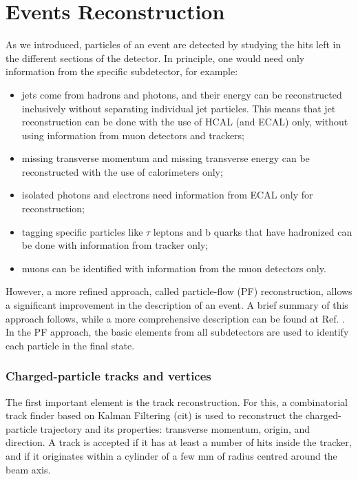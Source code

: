 \section{Events Reconstruction}
As we introduced, particles of an event are detected by studying the hits left in the different sections of the detector. In principle, one would need only information from the specific subdetector, for example:
\begin{itemize}
    \item jets come from hadrons and photons, and their energy can be reconstructed inclusively without separating individual jet particles. This means that jet reconstruction can be done with the use of HCAL (and ECAL) only, without using information from muon detectors and trackers;
    \item missing transverse momentum and missing transverse energy can be reconstructed with the use of calorimeters only;
    \item isolated photons and electrons need information from ECAL only for reconstruction;
    \item tagging specific particles like $\tau$ leptons and b quarks that have hadronized can be done with information from tracker only;
    \item muons can be identified with information from the muon detectors only.
\end{itemize}
However, a more refined approach, called particle-flow (PF) reconstruction, allows a significant improvement in the description of an event. A brief summary of this approach follows, while a more comprehensive description can be found at Ref. \cite{particle_flow}.\\
In the PF approach, the basic elements from all subdetectors are used to identify each particle in the final state.
\subsubsection{Charged-particle tracks and vertices}
The first important element is the track reconstruction. For this, a combinatorial track finder based on Kalman Filtering (cit) is used to reconstruct the charged-particle trajectory and its properties: transverse momentum, origin, and direction. A track is accepted if it has at least a number of hits inside the tracker, and if it originates within a cylinder of a few mm of radius centred around the beam axis. 
